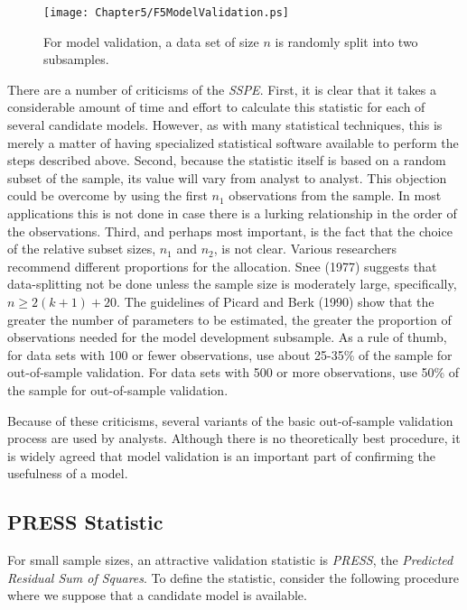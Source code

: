 \begin{figure}[htp]
  \begin{center}
    \texttt{[image: Chapter5/F5ModelValidation.ps]}
    \caption{\label{F5:ModelValidation} \small  For model validation, a
data set of size $n$ is randomly split into two subsamples.}
  \end{center}
\end{figure}


There are a number of criticisms of the \textit{SSPE}. First, it is
clear that it takes a considerable amount of time and effort to
calculate this statistic for each of several candidate models.
However, as with many statistical techniques, this is merely a
matter of having specialized statistical software available to
perform the steps described above. Second, because the statistic
itself is based on a random subset of the sample, its value will
vary from analyst to analyst. This objection could be overcome by
using the first $n_1$ observations from the sample. In most
applications this is not done in case there is a lurking
relationship in the order of the observations. Third, and perhaps
most important, is the fact that the choice of the relative subset
sizes, $n_1$ and $n_2$, is not clear. Various researchers recommend
different proportions for the allocation. Snee (1977) suggests that
data-splitting not be done unless the sample size is moderately
large, specifically, $n\geq 2(k+1)+20$. The guidelines of Picard and
Berk (1990) show that the greater the number of parameters to be
estimated, the greater the proportion of observations needed for the
model development subsample. As a rule of thumb, for data sets with
100 or fewer observations, use about 25-35\% of the sample for
out-of-sample validation. For data sets with 500 or more
observations, use 50\% of the sample for out-of-sample validation.

Because of these criticisms, several variants of the basic out-of-sample
validation process are used by analysts. Although there is no theoretically
best procedure, it is widely agreed that model validation is an important
part of confirming the usefulness of a model.

\subsection{PRESS Statistic}\label{S5:PRESS}

For small sample sizes, an attractive validation statistic is
\textit{PRESS}, the \textit{Predicted Residual Sum of Squares}. To
define the statistic, consider the following procedure where we
suppose that a candidate model is available.

